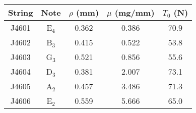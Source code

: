 \begin{tabular}{ccccc}
\toprule
String & Note & $\rho$ (mm) & $\mu$ (mg/mm) & $T_0$ (N) \\
\midrule
J4601 & E$_{4}$ & 0.362 & 0.386 & 70.9 \\
J4602 & B$_{3}$ & 0.415 & 0.522 & 53.8 \\
J4603 & G$_{3}$ & 0.521 & 0.856 & 55.6 \\
J4604 & D$_{3}$ & 0.381 & 2.007 & 73.1 \\
J4605 & A$_{2}$ & 0.457 & 3.486 & 71.3 \\
J4606 & E$_{2}$ & 0.559 & 5.666 & 65.0 \\
\bottomrule
\end{tabular}

